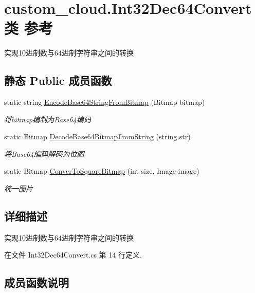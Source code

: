 \hypertarget{classcustom__cloud_1_1_int32_dec64_convert}{}\section{custom\+\_\+cloud.\+Int32\+Dec64\+Convert类 参考}
\label{classcustom__cloud_1_1_int32_dec64_convert}


实现10进制数与64进制字符串之间的转换  


\subsection*{静态 Public 成员函数}
\begin{DoxyCompactItemize}
\item 
static string \hyperlink{classcustom__cloud_1_1_int32_dec64_convert_a1f39ef67ce8744c91304566d07cbfa29}{Encode\+Base64\+String\+From\+Bitmap} (Bitmap bitmap)
\begin{DoxyCompactList}\small\item\em 将bitmap编制为\+Base64编码 \end{DoxyCompactList}\item 
static Bitmap \hyperlink{classcustom__cloud_1_1_int32_dec64_convert_a1d1e54accecc0717f6d9a584a47765ca}{Decode\+Base64\+Bitmap\+From\+String} (string str)
\begin{DoxyCompactList}\small\item\em 将\+Base64编码解码为位图 \end{DoxyCompactList}\item 
static Bitmap \hyperlink{classcustom__cloud_1_1_int32_dec64_convert_a00b142bc2b9fc72f596ef74d8da26f34}{Conver\+To\+Square\+Bitmap} (int size, Image image)
\begin{DoxyCompactList}\small\item\em 统一图片 \end{DoxyCompactList}\end{DoxyCompactItemize}


\subsection{详细描述}
实现10进制数与64进制字符串之间的转换 



在文件 Int32\+Dec64\+Convert.\+cs 第 14 行定义.



\subsection{成员函数说明}
\mbox{\label{classcustom__cloud_1_1_int32_dec64_convert_a00b142bc2b9fc72f596ef74d8da26f34}} 

